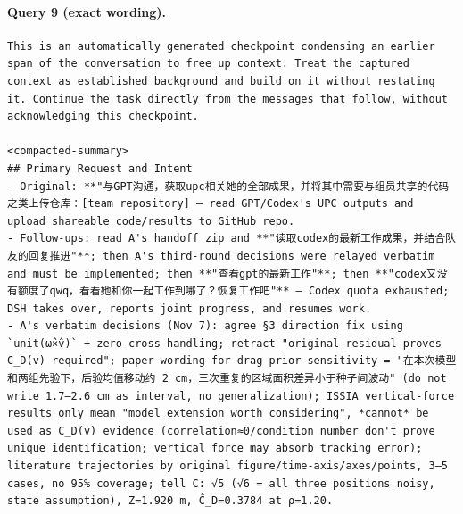 \documentclass[UTF8,10pt]{ctexart}
\begin{document}
\paragraph{Query 9 (exact wording).}
\begin{Verbatim}[breaklines=true,breakanywhere=true,fontsize=\scriptsize,frame=single,framesep=2pt]
This is an automatically generated checkpoint condensing an earlier span of the conversation to free up context. Treat the captured context as established background and build on it without restating it. Continue the task directly from the messages that follow, without acknowledging this checkpoint.

<compacted-summary>
## Primary Request and Intent
- Original: **"与GPT沟通，获取upc相关她的全部成果，并将其中需要与组员共享的代码之类上传仓库：[team repository] — read GPT/Codex's UPC outputs and upload shareable code/results to GitHub repo.
- Follow-ups: read A's handoff zip and **"读取codex的最新工作成果，并结合队友的回复推进"**; then A's third-round decisions were relayed verbatim and must be implemented; then **"查看gpt的最新工作"**; then **"codex又没有额度了qwq，看看她和你一起工作到哪了？恢复工作吧"** — Codex quota exhausted; DSH takes over, reports joint progress, and resumes work.
- A's verbatim decisions (Nov 7): agree §3 direction fix using `unit(ω̂×v̂)` + zero-cross handling; retract "original residual proves C_D(v) required"; paper wording for drag-prior sensitivity = "在本次模型和两组先验下，后验均值移动约 2 cm，三次重复的区域面积差异小于种子间波动" (do not write 1.7–2.6 cm as interval, no generalization); ISSIA vertical-force results only mean "model extension worth considering", *cannot* be used as C_D(v) evidence (correlation≈0/condition number don't prove unique identification; vertical force may absorb tracking error); literature trajectories by original figure/time-axis/axes/points, 3–5 cases, no 95% coverage; tell C: √5 (√6 = all three positions noisy, state assumption), Z=1.920 m, Ĉ_D=0.3784 at ρ=1.20.


\end{Verbatim}
\end{document}
